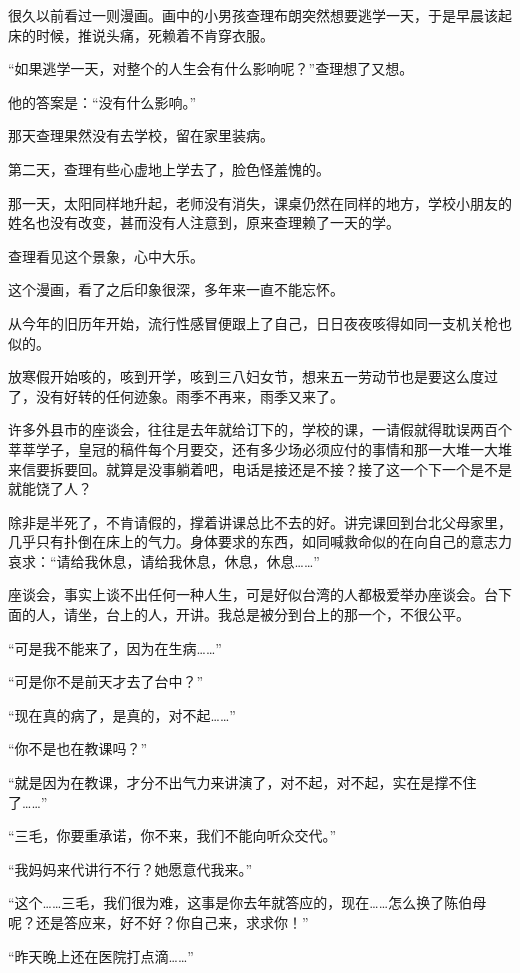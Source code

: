 \par 很久以前看过一则漫画。画中的小男孩查理布朗突然想要逃学一天，于是早晨该起床的时候，推说头痛，死赖着不肯穿衣服。
\par “如果逃学一天，对整个的人生会有什么影响呢？”查理想了又想。
\par 他的答案是：“没有什么影响。”
\par 那天查理果然没有去学校，留在家里装病。
\par 第二天，查理有些心虚地上学去了，脸色怪羞愧的。
\par 那一天，太阳同样地升起，老师没有消失，课桌仍然在同样的地方，学校小朋友的姓名也没有改变，甚而没有人注意到，原来查理赖了一天的学。
\par 查理看见这个景象，心中大乐。
\par 这个漫画，看了之后印象很深，多年来一直不能忘怀。
\par 从今年的旧历年开始，流行性感冒便跟上了自己，日日夜夜咳得如同一支机关枪也似的。
\par 放寒假开始咳的，咳到开学，咳到三八妇女节，想来五一劳动节也是要这么度过了，没有好转的任何迹象。雨季不再来，雨季又来了。
\par 许多外县市的座谈会，往往是去年就给订下的，学校的课，一请假就得耽误两百个莘莘学子，皇冠的稿件每个月要交，还有多少场必须应付的事情和那一大堆一大堆来信要拆要回。就算是没事躺着吧，电话是接还是不接？接了这一个下一个是不是就能饶了人？
\par 除非是半死了，不肯请假的，撑着讲课总比不去的好。讲完课回到台北父母家里，几乎只有扑倒在床上的气力。身体要求的东西，如同喊救命似的在向自己的意志力哀求：“请给我休息，请给我休息，休息，休息……”
\par 座谈会，事实上谈不出任何一种人生，可是好似台湾的人都极爱举办座谈会。台下面的人，请坐，台上的人，开讲。我总是被分到台上的那一个，不很公平。
\par “可是我不能来了，因为在生病……”
\par “可是你不是前天才去了台中？”
\par “现在真的病了，是真的，对不起……”
\par “你不是也在教课吗？”
\par “就是因为在教课，才分不出气力来讲演了，对不起，对不起，实在是撑不住了……”
\par “三毛，你要重承诺，你不来，我们不能向听众交代。”
\par “我妈妈来代讲行不行？她愿意代我来。”
\par “这个……三毛，我们很为难，这事是你去年就答应的，现在……怎么换了陈伯母呢？还是答应来，好不好？你自己来，求求你！”
\par “昨天晚上还在医院打点滴……”
